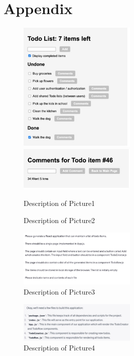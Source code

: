 \documentclass[runningheads]{llncs}
\begin{document}
\section*{Appendix}
\begin{figure}[h]
    \centering
    \includegraphics[width=0.5\textwidth]{Pictures/Picture1.jpg}
    \includegraphics[width=0.5\textwidth]{Pictures/Picture2.jpg}
    \caption{Description of Picture1}
    \label{fig:picture1}
\end{figure}
\begin{figure}[h]
    \centering
    \caption{Description of Picture2}
    \label{fig:picture2}
\end{figure}
\begin{figure}[h]
    \centering
    \includegraphics[width=0.5\textwidth]{Pictures/Picture3.jpg}
    \caption{Description of Picture3}
    \label{fig:picture3}
\end{figure}
\begin{figure}[h]
    \centering
    \includegraphics[width=0.5\textwidth]{Pictures/Picture4.jpg}
    \caption{Description of Picture4}
    \label{fig:picture4}
\end{figure}
\end{document}
